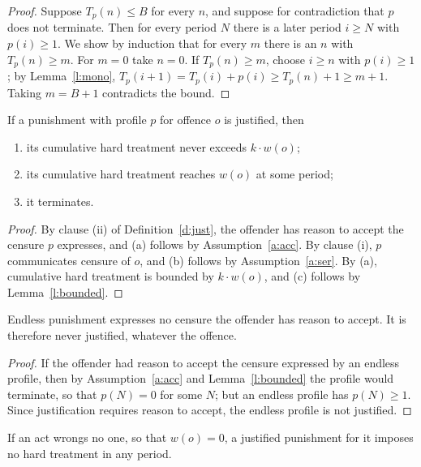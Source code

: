 \documentclass{situationist-preprint}
\begin{document}
\begin{proof}
Suppose $T_p(n)\le B$ for every $n$, and suppose for contradiction that $p$ does not terminate. Then for every period $N$ there is a later period $i\ge N$ with $p(i)\ge 1$. We show by induction that for every $m$ there is an $n$ with $T_p(n)\ge m$. For $m=0$ take $n=0$. If $T_p(n)\ge m$, choose $i\ge n$ with $p(i)\ge 1$; by Lemma~\ref{l:mono}, $T_p(i+1)=T_p(i)+p(i)\ge T_p(n)+1\ge m+1$. Taking $m=B+1$ contradicts the bound.
\end{proof}

\begin{theorem}\label{t:main}
If a punishment with profile $p$ for offence $o$ is justified, then
\begin{enumerate}[label=(\alph*)]
\item its cumulative hard treatment never exceeds $k\cdot w(o)$;
\item its cumulative hard treatment reaches $w(o)$ at some period;
\item it terminates.
\end{enumerate}
\end{theorem}

\begin{proof}
By clause (ii) of Definition~\ref{d:just}, the offender has reason to accept the censure $p$ expresses, and (a) follows by Assumption~\ref{a:acc}. By clause (i), $p$ communicates censure of $o$, and (b) follows by Assumption~\ref{a:ser}. By (a), cumulative hard treatment is bounded by $k\cdot w(o)$, and (c) follows by Lemma~\ref{l:bounded}.
\end{proof}

\begin{corollary}\label{c:endless}
Endless punishment expresses no censure the offender has reason to accept. It is therefore never justified, whatever the offence.
\end{corollary}

\begin{proof}
If the offender had reason to accept the censure expressed by an endless profile, then by Assumption~\ref{a:acc} and Lemma~\ref{l:bounded} the profile would terminate, so that $p(N)=0$ for some $N$; but an endless profile has $p(N)\ge 1$. Since justification requires reason to accept, the endless profile is not justified.
\end{proof}

\begin{corollary}\label{c:zero}
If an act wrongs no one, so that $w(o)=0$, a justified punishment for it imposes no hard treatment in any period.
\end{corollary}
\end{document}

